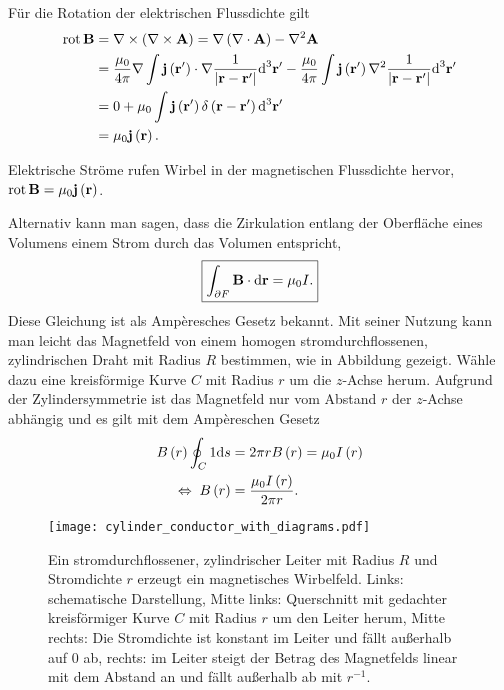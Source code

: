 Für die Rotation der elektrischen Flussdichte gilt
\begin{align}
\begin{split}
    \label{eq:durchflutungsgesetz_magnetostatik}
	\operatorname{rot} \mathbf{B}&=\nabla \times \left(\nabla \times \mathbf{A}\right)=\nabla \left(\nabla \cdot \mathbf{A}\right)-\nabla ^{2}\mathbf{A}\\
	&=\frac{\mu _{0}}{4\pi }\nabla \int \mathbf{j}\left(\mathbf{r}'\right)\cdot \nabla \frac{1}{\left| \mathbf{r}-\mathbf{r}'\right| }\text{d} ^{3}\mathbf{r}'-\frac{\mu _{0}}{4\pi }\int \mathbf{j}\left(\mathbf{r}'\right)\nabla ^{2}\frac{1}{\left| \mathbf{r}-\mathbf{r}'\right| }\text{d} ^{3}\mathbf{r}'\\
	&=0+\mu _{0}\int \mathbf{j}\left(\mathbf{r}'\right)\delta \left(\mathbf{r}-\mathbf{r}'\right)\text{d} ^{3}\mathbf{r}'\\&=\mu _{0}\mathbf{j}\left(\mathbf{r}\right).
\end{split}
\end{align}

\begin{formal}
	Elektrische Ströme rufen Wirbel in der magnetischen Flussdichte hervor, $\operatorname{rot} \mathbf{B}=\mu _{0}\mathbf{j}\left(\mathbf{r}\right)$.
\end{formal}
Alternativ kann man sagen, dass die Zirkulation entlang der Oberfläche eines Volumens einem Strom durch das Volumen entspricht,
\begin{equation*}
	\boxed{\int _{\partial F}\mathbf{B}\cdot \text{d} \mathbf{r}=\mu _{0}I.}
\end{equation*}
Diese Gleichung ist als Ampèresches Gesetz bekannt. Mit seiner Nutzung kann man leicht das Magnetfeld von einem homogen stromdurchflossenen, zylindrischen Draht mit Radius $R$ bestimmen, wie in Abbildung  gezeigt. Wähle dazu eine kreisförmige Kurve $C$ mit Radius $r$ um die $z$-Achse herum. Aufgrund der Zylindersymmetrie ist das Magnetfeld nur vom Abstand $r$ der $z$-Achse abhängig und es gilt mit dem Ampèreschen Gesetz
\begin{align*}
		B\left(r\right)\oint _{C}1\text{d} s&=2\pi rB\left(r\right)=\mu _{0}I\left(r\right) \\
		\;\Leftrightarrow\; B\left(r\right)&=\frac{\mu _{0}I\left(r\right)}{2\pi r}.
\end{align*}


\begin{figure}[htb]
	\centering
	\texttt{[image: cylinder\_conductor\_with\_diagrams.pdf]}
	\caption{Ein stromdurchflossener, zylindrischer Leiter mit Radius $R$ und Stromdichte $r$ erzeugt ein magnetisches Wirbelfeld. Links: schematische Darstellung, Mitte links: Querschnitt mit gedachter kreisförmiger Kurve $C$ mit Radius $r$ um den Leiter herum, Mitte rechts: Die Stromdichte ist konstant im Leiter und fällt außerhalb auf $0$ ab, rechts: im Leiter steigt der Betrag des Magnetfelds linear mit dem Abstand an und fällt außerhalb ab mit $r^{-1}$.  }
	\label{fig:cylinder_conductor_with_diagrams}
\end{figure}

